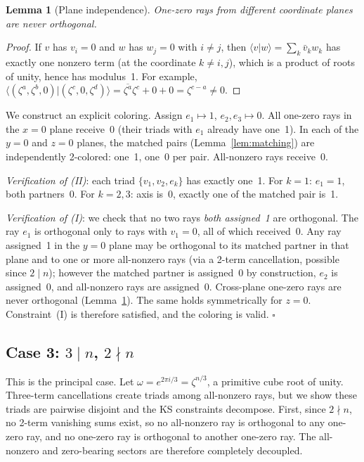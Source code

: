 \documentclass[twocolumn,prl,superscriptaddress,nofootinbib]{revtex4-2}
\newtheorem{lemma}{Lemma}
\begin{document}
\begin{lemma}[Plane independence]\label{lem:planes}
One-zero rays from different coordinate planes are never orthogonal.
\end{lemma}

\begin{proof}
If $v$ has $v_i = 0$ and $w$ has $w_j = 0$ with $i \neq j$, then $\langle v | w \rangle = \sum_k \bar{v}_k w_k$ has exactly one nonzero term (at the coordinate $k \neq i, j$), which is a product of roots of unity, hence has modulus~1. For example, $\langle(\zeta^a, \zeta^b, 0) | (\zeta^c, 0, \zeta^d)\rangle = \overline{\zeta^a}\zeta^c + 0 + 0 = \zeta^{c-a} \neq 0$.
\end{proof}

We construct an explicit coloring.  Assign $e_1 \mapsto 1$, $e_2, e_3 \mapsto 0$.  All one-zero rays in the $x{=}0$ plane receive~0 (their triads with $e_1$ already have one~1).  In each of the $y{=}0$ and $z{=}0$ planes, the matched pairs (Lemma~\ref{lem:matching}) are independently 2-colored: one~1, one~0 per pair.  All-nonzero rays receive~0.

\emph{Verification of (II)}: each triad $\{v_1, v_2, e_k\}$ has exactly one~1.  For $k = 1$: $e_1 = 1$, both partners~0.  For $k = 2, 3$: axis is~0, exactly one of the matched pair is~1.

\emph{Verification of (I)}: we check that no two rays \emph{both assigned~1} are orthogonal.  The ray $e_1$ is orthogonal only to rays with $v_1 = 0$, all of which received~0.  Any ray assigned~1 in the $y{=}0$ plane may be orthogonal to its matched partner in that plane and to one or more all-nonzero rays (via a 2-term cancellation, possible since $2 \mid n$); however the matched partner is assigned~0 by construction, $e_2$ is assigned~0, and all-nonzero rays are assigned~0.  Cross-plane one-zero rays are never orthogonal (Lemma~\ref{lem:planes}).  The same holds symmetrically for $z{=}0$.  Constraint~(I) is therefore satisfied, and the coloring is valid.  $\square$

\subsection{Case 3: $3 \mid n$, $2 \nmid n$}

This is the principal case.  Let $\omega = e^{2\pi i/3} = \zeta^{n/3}$, a primitive cube root of unity.  Three-term cancellations create triads among all-nonzero rays, but we show these triads are pairwise disjoint and the KS constraints decompose.  First, since $2 \nmid n$, no 2-term vanishing sums exist, so no all-nonzero ray is orthogonal to any one-zero ray, and no one-zero ray is orthogonal to another one-zero ray.  The all-nonzero and zero-bearing sectors are therefore completely decoupled.
\end{document}
